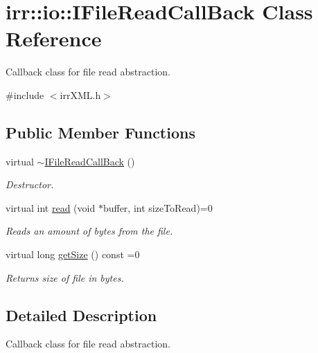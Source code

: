 \hypertarget{classirr_1_1io_1_1IFileReadCallBack}{}\section{irr\+:\+:io\+:\+:I\+File\+Read\+Call\+Back Class Reference}
\label{classirr_1_1io_1_1IFileReadCallBack}


Callback class for file read abstraction.  




{\ttfamily \#include $<$irr\+X\+M\+L.\+h$>$}

\subsection*{Public Member Functions}
\begin{DoxyCompactItemize}
\item 
virtual \hyperlink{classirr_1_1io_1_1IFileReadCallBack_a91ace84f0a3966d88d78da5342eb9619}{$\sim$\+I\+File\+Read\+Call\+Back} ()\hypertarget{classirr_1_1io_1_1IFileReadCallBack_a91ace84f0a3966d88d78da5342eb9619}{}\label{classirr_1_1io_1_1IFileReadCallBack_a91ace84f0a3966d88d78da5342eb9619}

\begin{DoxyCompactList}\small\item\em Destructor. \end{DoxyCompactList}\item 
virtual int \hyperlink{classirr_1_1io_1_1IFileReadCallBack_ae8c57b8454078aa2acd39772a6aa4439}{read} (void $\ast$buffer, int size\+To\+Read)=0
\begin{DoxyCompactList}\small\item\em Reads an amount of bytes from the file. \end{DoxyCompactList}\item 
virtual long \hyperlink{classirr_1_1io_1_1IFileReadCallBack_a31ee0fbc44db4568bffe0ce526478f5d}{get\+Size} () const  =0\hypertarget{classirr_1_1io_1_1IFileReadCallBack_a31ee0fbc44db4568bffe0ce526478f5d}{}\label{classirr_1_1io_1_1IFileReadCallBack_a31ee0fbc44db4568bffe0ce526478f5d}

\begin{DoxyCompactList}\small\item\em Returns size of file in bytes. \end{DoxyCompactList}\end{DoxyCompactItemize}


\subsection{Detailed Description}
Callback class for file read abstraction. 

